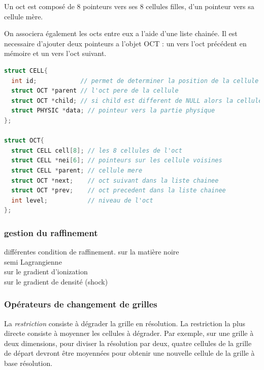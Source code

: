 Un oct est composé de 8 pointeurs vers ses 8 cellules filles, d'un pointeur vers sa cellule mère.

On associera également les octs entre eux a l'aide d'une liste chainée. 
Il est necessaire d'ajouter deux pointeurs a l'objet OCT : un vers l'oct précédent en mémoire et un vers l'oct suivant.


\begin{lstlisting}[float=bth,language=C,frame=tb,caption={les structures CELL et OCT de EMMA},label=lst:useless]
struct CELL{
  int id;            // permet de determiner la position de la cellule dans l'oct
  struct OCT *parent // l'oct pere de la cellule
  struct OCT *child; // si child est different de NULL alors la cellule est raffiner et child point vers l'oct enfant
  struct PHYSIC *data; // pointeur vers la partie physique
};

struct OCT{
  struct CELL cell[8]; // les 8 cellules de l'oct
  struct CELL *nei[6]; // pointeurs sur les cellule voisines
  struct CELL *parent; // cellule mere
  struct OCT *next;    // oct suivant dans la liste chainee
  struct OCT *prev;    // oct precedent dans la liste chainee
  int level;           // niveau de l'oct
};
\end{lstlisting}





\subsubsection{gestion du raffinement}
différentes condition de raffinement.
sur la matière noire\\
semi Lagrangienne\\
sur le gradient d'ionization\\
sur le gradient de densité (shock)\\





\subsubsection{Opérateurs de changement de grilles} \label{Opérateurs de changement de grilles}

La \emph{restriction} consiste à dégrader la grille en résolution. La restriction la plus directe consiste à moyenner les cellules à dégrader. Par exemple, sur une grille à deux dimensions, pour diviser la résolution par deux, quatre cellules de la grille de départ devront être moyennées pour obtenir une nouvelle cellule de la grille à base résolution. \\

